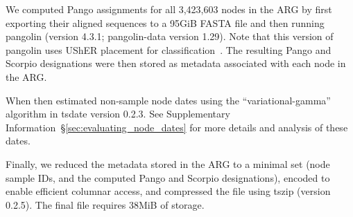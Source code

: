\documentclass[12pt]{article}
\newcommand{\supref}[1]{Supplementary Information~\S\ref{#1}}
\begin{document}
We computed Pango assignments for all 3,423,603 nodes in the ARG by first
exporting their aligned sequences to a 95GiB FASTA file and
then running pangolin (version 4.3.1; pangolin-data version 1.29).
Note that this version of pangolin uses UShER placement
for classification~\cite{McBroome2024}.
The resulting Pango and Scorpio designations were then stored as
metadata associated with each node in the ARG.

When then estimated non-sample node dates using
the ``variational-gamma'' algorithm in tsdate\cite{Wohns2022,Pope2025}
version 0.2.3. See \supref{sec:evaluating_node_dates} for
more details and analysis of these dates.

Finally, we reduced the metadata stored in the ARG to a minimal
set (node sample IDs, and the computed Pango and Scorpio
designations), encoded to enable efficient columnar access,
and compressed the file using tszip (version 0.2.5). The final
file requires 38MiB of storage.


\end{document}
